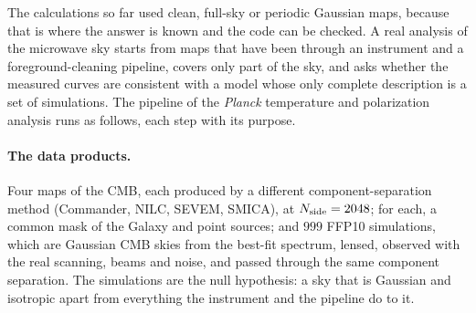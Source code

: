 The calculations so far used clean, full-sky or periodic Gaussian maps, because that is where the answer is
known and the code can be checked. A real analysis of the microwave sky starts from maps that have been
through an instrument and a foreground-cleaning pipeline, covers only part of the sky, and asks whether the
measured curves are consistent with a model whose only complete description is a set of simulations. The
pipeline of the \textit{Planck} temperature and polarization analysis \cite{Planck2018VII} runs as follows,
each step with its purpose.

\paragraph{The data products.} Four maps of the CMB, each produced by a different component-separation method
(Commander, NILC, SEVEM, SMICA), at $N_{\rm side}=2048$; for each, a common mask of the Galaxy and point
sources; and $999$ FFP10 simulations, which are Gaussian CMB skies from the best-fit spectrum, lensed, observed
with the real scanning, beams and noise, and passed through the same component separation. The simulations
are the null hypothesis: a sky that is Gaussian and isotropic apart from everything the instrument and the
pipeline do to it.

